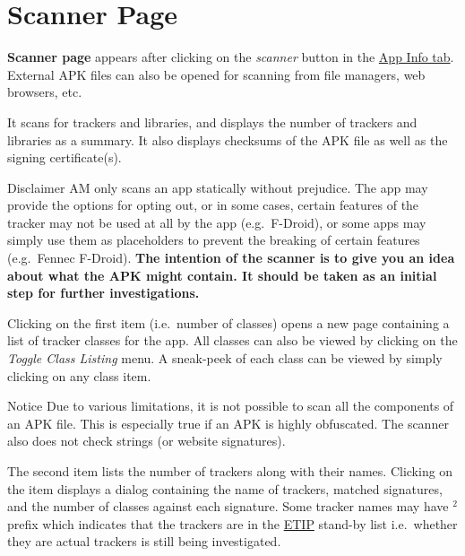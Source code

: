 \section{Scanner Page}\label{sec:scanner-page} %
\textbf{Scanner page} appears after clicking on the \emph{scanner} button in the \hyperref[subsec:app-info-tab]{App Info
tab}. External APK files can also be opened for scanning from file managers, web browsers, etc.

It scans for trackers and libraries, and displays the number of trackers and libraries as a summary. It also displays
checksums of the APK file as well as the signing certificate(s).

\begin{danger}{Disclaimer}
    AM only scans an app statically without prejudice. The app may provide the options for opting out, or in some cases,
    certain features of the tracker may not be used at all by the app (e.g.\ F-Droid), or some apps may simply use them
    as placeholders to prevent the breaking of certain features (e.g.\ Fennec F-Droid). \textbf{The intention of the
    scanner is to give you an idea about what the APK might contain. It should be taken as an initial step for further
    investigations.}
\end{danger}

Clicking on the first item (i.e.\ number of classes) opens a new page containing a list of tracker classes for the app.
All classes can also be viewed by clicking on the \textit{Toggle Class Listing} menu. A sneak-peek of each class can be
viewed by simply clicking on any class item.

\begin{tip}{Notice}
    Due to various limitations, it is not possible to scan all the components of an APK file. This is especially true if
    an APK is highly obfuscated. The scanner also does not check strings (or website signatures).
\end{tip}

The second item lists the number of trackers along with their names. Clicking on the item displays a dialog containing
the name of trackers, matched signatures, and the number of classes against each signature. Some tracker names may have
$^2$ prefix which indicates that the trackers are in the \href{https://etip.exodus-privacy.eu.org}{ETIP} stand-by list
i.e.\ whether they are actual trackers is still being investigated.

